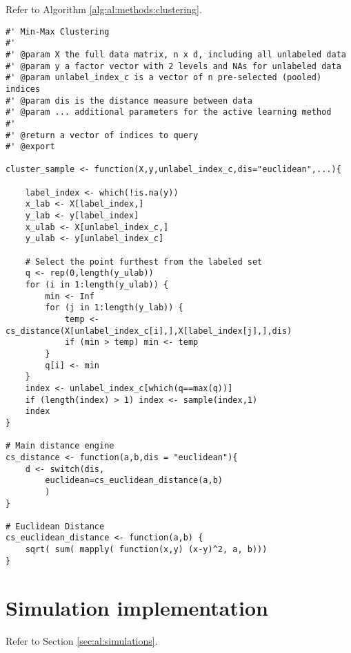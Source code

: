Refer to Algorithm \ref{alg:al:methods:clustering}. 
{
\begin{lstlisting}
#' Min-Max Clustering
#'
#' @param X the full data matrix, n x d, including all unlabeled data
#' @param y a factor vector with 2 levels and NAs for unlabeled data
#' @param unlabel_index_c is a vector of n pre-selected (pooled) indices
#' @param dis is the distance measure between data
#' @param ... additional parameters for the active learning method
#'
#' @return a vector of indices to query
#' @export

cluster_sample <- function(X,y,unlabel_index_c,dis="euclidean",...){

	label_index <- which(!is.na(y))
	x_lab <- X[label_index,]
	y_lab <- y[label_index]
	x_ulab <- X[unlabel_index_c,]
	y_ulab <- y[unlabel_index_c]
	
	# Select the point furthest from the labeled set
	q <- rep(0,length(y_ulab))
	for (i in 1:length(y_ulab)) {
		min <- Inf
		for (j in 1:length(y_lab)) {
			temp <- cs_distance(X[unlabel_index_c[i],],X[label_index[j],],dis)
			if (min > temp) min <- temp
		}
		q[i] <- min
	}
	index <- unlabel_index_c[which(q==max(q))]
	if (length(index) > 1) index <- sample(index,1)
	index
}

# Main distance engine
cs_distance <- function(a,b,dis = "euclidean"){
	d <- switch(dis,
		euclidean=cs_euclidean_distance(a,b)
		)
}

# Euclidean Distance
cs_euclidean_distance <- function(a,b) {
	sqrt( sum( mapply( function(x,y) (x-y)^2, a, b)))
}
\end{lstlisting}
}

\section{Simulation implementation}
\label{sec:appendicies:al:simulations}

Refer to Section \ref{sec:al:simulations}.
